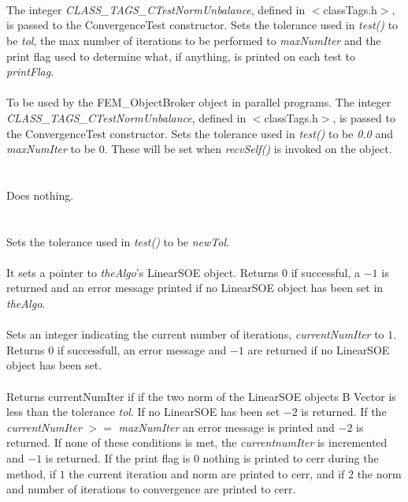   \\
  \\ 
  \\
The integer {\em CLASS\_TAGS\_CTestNormUnbalance}, defined in
$<$classTags.h$>$, is passed to the ConvergenceTest constructor. 
Sets the tolerance used in {\em test()} to be {\em tol}, the max
number of iterations to be performed to {\em maxNumIter} and the print
flag used to determine what, if anything, is printed on each test to
{\em printFlag}. \\

  \\
To be used by the FEM\_ObjectBroker object in parallel programs. The
integer {\em CLASS\_TAGS\_CTestNormUnbalance}, defined in
$<$classTags.h$>$, is passed to the ConvergenceTest constructor. Sets
the tolerance used in {\em test()} to be {\em 0.0} and {\em maxNumIter} 
to be $0$. These will be set when {\em recvSelf()} is invoked on the object. \\

 \\
 \\ 
Does nothing. \\

  \\
 \\
Sets the tolerance used in {\em test()} to be {\em newTol}. \\

 \\
It sets a pointer to {\em theAlgo}'s LinearSOE object. Returns $0$ if
successful, a $-1$ is returned and an error message printed if no
LinearSOE object has been set in {\em theAlgo}. \\

 \\
Sets an integer indicating the current number of iterations, {\em
currentNumIter} to $1$. Returns $0$ if successfull, an error message
and $-1$ are returned if no LinearSOE object has been set. \\ 

 \\
Returns {currentNumIter} if if the two norm of the LinearSOE objects B
Vector is less than the tolerance {\em tol}. If no LinearSOE has been
set $-2$ is returned. If the {\em currentNumIter} $>=$ {\em
maxNumIter} an error message is printed and $-2$ is returned. If none
of these conditions is met, the {\em currentnumIter} is incremented 
and $-1$ is returned. If the print flag is $0$ nothing is printed to
cerr during the method, if $1$ the current iteration and norm are
printed to cerr, and if $2$ the norm and number of iterations to convergence
are printed to cerr. \\ 


